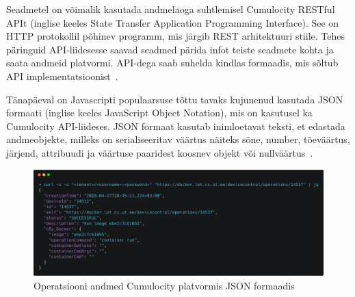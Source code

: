 \documentclass[12pt]{article}
\begin{document}
  Seadmetel on võimalik kasutada andmelaoga suhtlemisel Cumulocity RESTful APIt
  (inglise keeles State Transfer Application Programming Interface). See on HTTP protokollil põhinev
  programm, mis järgib REST arhitektuuri stiile. Tehes päringuid API-liidesesse saavad seadmed pärida
  infot teiste seadmete kohta ja saata andmeid platvormi. API-dega saab suhelda kindlas formaadis,
  mis sõltub API implementatsioonist~\cite{cumulocityRestDocumentation}.

  Tänapäeval on Javascripti populaarsuse tõttu tavaks kujunenud kasutada JSON formaati
  (inglise keeles JavaScript Object Notation), mis on kasutusel ka Cumulocity API-liideses.
  JSON formaat kasutab inimloetavat teksti, et edastada andmeobjekte,
  milleks on serialiseeritav väärtus näiteks sõne, number, tõeväärtus, järjend, attribuudi ja väärtuse paaridest
  koosnev objekt või nullväärtus~\cite{JSON}. 


  \begin{figure} [ht] %
  \begin{center}
  \includegraphics[width=1\textwidth]{operation14537}
  \caption{Operatsiooni andmed Cumulocity platvormis JSON formaadis}
  \label{fig:operation14537}
  \end{center}
  \end{figure}
\end{document}
